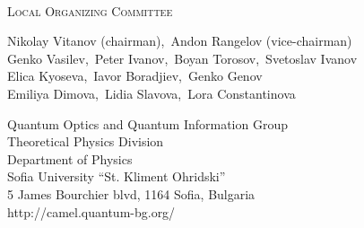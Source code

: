 \documentclass[12pt]{report}
\begin{document}
\newpage

\ \vspace{20mm}
\begin{center}

\Large{ \textsc{Local Organizing Committee}}

{\large

Nikolay Vitanov (chairman),\ Andon Rangelov (vice-chairman)\\
Genko Vasilev,\ Peter Ivanov,\ Boyan Torosov,\ Svetoslav Ivanov \\
Elica Kyoseva,\ Iavor Boradjiev,\ Genko Genov \\
Emiliya Dimova,\ Lidia Slavova,\ Lora Constantinova

\vspace{15mm}

Quantum Optics and Quantum Information Group \\
Theoretical Physics Division \\
Department of Physics\\
Sofia University ``St. Kliment Ohridski''\\
5 James Bourchier blvd, 1164 Sofia, Bulgaria \\
http://camel.quantum-bg.org/

}




\end{center}
\newpage

\thispagestyle{empty}
\end{document}
